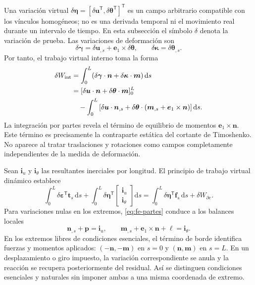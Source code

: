 \documentclass[11pt,a4paper,oneside]{report}
\newcommand{\vct}[1]{\bm{#1}}
\newcommand{\dd}{\mathrm d}
\newcommand{\tr}{\mathsf T}
\begin{document}
Una variación virtual $\delta\vct\eta=[\delta\vct u^{\tr},
\delta\vct\theta^{\tr}]^{\tr}$ es un campo arbitrario compatible con los
vínculos homogéneos; no es una derivada temporal ni el movimiento real durante
un intervalo de tiempo. En esta subsección el símbolo $\delta$ denota la
variación de prueba. Las variaciones de deformación son
\begin{equation}
 \delta\vct\gamma=\delta\vct u_{,s}
 +\vct e_1\times\delta\vct\theta,
 \qquad
 \delta\vct\kappa=\delta\vct\theta_{,s}.
\end{equation}
Por tanto, el trabajo virtual interno toma la forma
\begin{align}
 \delta W_{\rm int}
 &=\int_0^L(\delta\vct\gamma\cdot\vct n
       +\delta\vct\kappa\cdot\vct m)\,\dd s\nonumber\\
 &=[\delta\vct u\cdot\vct n+
       \delta\vct\theta\cdot\vct m]_0^L\nonumber\\
 &\quad-\int_0^L\left[\delta\vct u\cdot\vct n_{,s}
       +\delta\vct\theta\cdot
       (\vct m_{,s}+\vct e_1\times\vct n)\right]\dd s.
 \label{eq:fe-partes}
\end{align}
La integración por partes revela el término de equilibrio de momentos
$\vct e_1\times\vct n$. Este término es precisamente la contraparte estática
del cortante de Timoshenko. No aparece al tratar traslaciones y rotaciones
como campos completamente independientes de la medida de deformación.

Sean $\vct i_u$ y $\vct i_\theta$ las resultantes inerciales por longitud.
El principio de trabajo virtual dinámico establece
\begin{equation}
 \int_0^L\delta\vct\varepsilon^{\tr}\vct t_s\,\dd s
 +\int_0^L\delta\vct\eta^{\tr}
        \begin{bmatrix}\vct i_u\\\vct i_\theta\end{bmatrix}\dd s
 =\int_0^L\delta\vct\eta^{\tr}\vct f_s\,\dd s
 +\delta W_{\partial e}.
 \label{eq:fe-debil}
\end{equation}
Para variaciones nulas en los extremos, \eqref{eq:fe-partes} conduce a los
balances locales
\begin{equation}
 \vct n_{,s}+\vct p=\vct i_u,\qquad
 \vct m_{,s}+\vct e_1\times\vct n+\vct\ell=\vct i_\theta.
\end{equation}
En los extremos libres de condiciones esenciales, el término de borde
identifica fuerzas y momentos aplicados: $(-\vct n,-\vct m)$ en $s=0$ y
$(\vct n,\vct m)$ en $s=L$. En un desplazamiento o giro impuesto, la variación
correspondiente se anula y la reacción se recupera posteriormente del
residual. Así se distinguen condiciones esenciales y naturales sin imponer
ambas a una misma coordenada de extremo.
\end{document}
